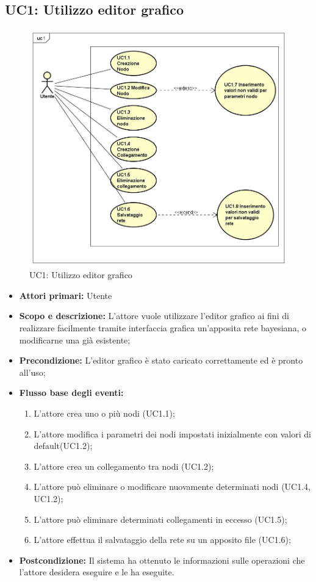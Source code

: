 \subsection{UC1: Utilizzo editor grafico} 
\begin{figure} [H]
	\centering
	\includegraphics[scale=0.45]{Img/UC1} 
	\caption{UC1: Utilizzo editor grafico} \label{} 
\end{figure} 
\begin{itemize} 
	\item{\textbf{Attori primari:} Utente} 
	\item{\textbf{Scopo e descrizione:} L'attore vuole utilizzare l'editor grafico ai fini di realizzare facilmente tramite interfaccia grafica un'apposita rete bayesiana, o modificarne una già esistente;} 
	\item{\textbf{Precondizione:} L'editor grafico è stato caricato correttamente ed è pronto all'uso;} 
	\item{\textbf{Flusso base degli eventi:} 
		\begin{enumerate} 
			\item{L'attore crea uno o più nodi (UC1.1);} 
			\item{L'attore modifica i parametri dei nodi impostati inizialmente con valori di default(UC1.2);} 
			\item{L'attore crea un collegamento tra nodi (UC1.2);} 
			\item{L'attore può eliminare o modificare nuovamente determinati nodi (UC1.4, UC1.2)}; 
			\item{L'attore può eliminare determinati collegamenti in eccesso (UC1.5);} 
			\item{L'attore effettua il salvataggio della rete su un apposito file (UC1.6);} 
		\end{enumerate} 
	} 
	\item{\textbf{Postcondizione:} Il sistema ha ottenuto le informazioni sulle operazioni che l'attore desidera eseguire e le ha eseguite.} 
\end{itemize} 
